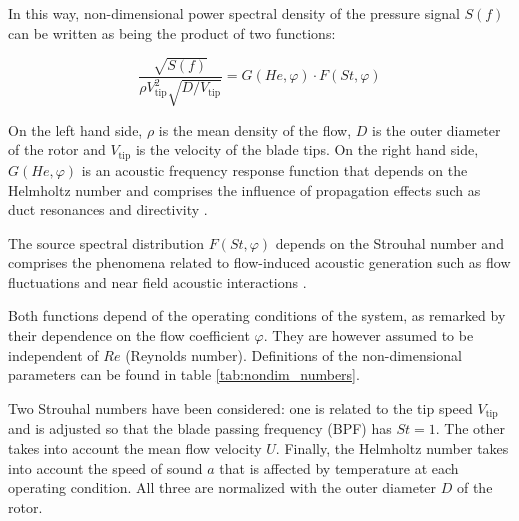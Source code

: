 In this way, non-dimensional power spectral density of the pressure signal $S(f)$ can be written \cite{mongeau1993sound,choi1994aerodynamic} as being the product of two functions: 

\begin{equation}\label{eq:non-dim_spectra}
	\frac{\sqrt{S(f)}}{\rho V^2_\text{tip}\sqrt{D/V_\text{tip}}}=
	G(He,\varphi)\cdot F(St,\varphi)
\end{equation}

On the left hand side, $\rho$ is the mean density of the flow, $D$ is the outer diameter of the rotor and $V_\text{tip}$ is the velocity of the blade tips. On the right hand side, $G(He,\varphi)$ is an acoustic frequency response function that depends on the Helmholtz number and comprises the influence of propagation effects such as duct resonances and directivity \cite{mongeau1993sound,wolfram2009detection}. 

The source spectral distribution $F(St,\varphi)$ depends on the Strouhal number and comprises the phenomena related to flow-induced acoustic generation such as flow fluctuations and near field acoustic interactions \cite{mongeau1995method}.

Both functions depend of the operating conditions of the system, as remarked by their dependence on the flow coefficient $\varphi$. They are however assumed to be independent of $Re$ (Reynolds number). Definitions of the non-dimensional parameters can be found in table \ref{tab:nondim_numbers}. 

Two Strouhal numbers have been considered: one is related to the tip speed $V_\text{tip}$ and is adjusted so that the blade passing frequency (BPF) has $St=1$. The other takes into account the mean flow velocity $U$. Finally, the Helmholtz number takes into account the speed of sound $a$ that is affected by temperature at each operating condition. All three are normalized with the outer diameter $D$ of the rotor.

